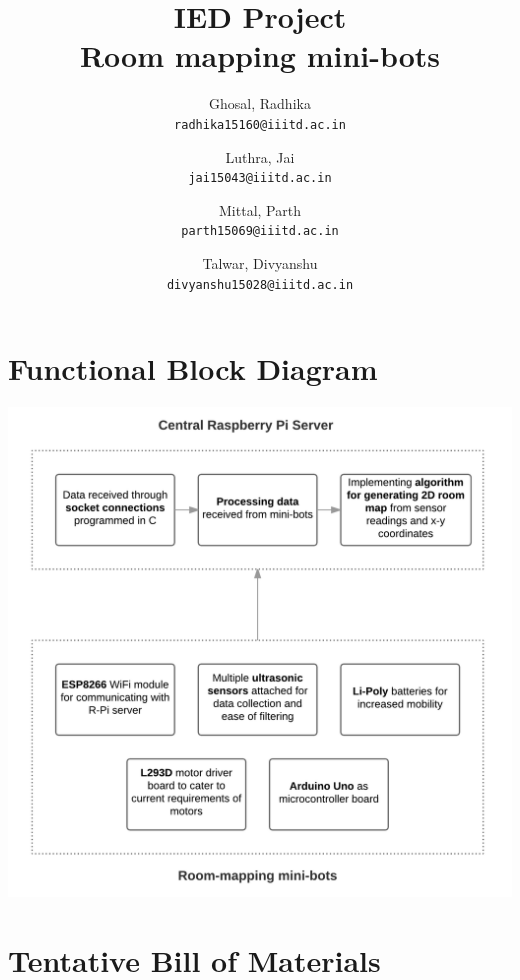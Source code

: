 \documentclass[12pt]{article}
\title{IED Project\\
        Room mapping mini-bots}
\author{
    Ghosal, Radhika\\
    \texttt{radhika15160@iiitd.ac.in}
    \and
    Luthra, Jai\\
    \texttt{jai15043@iiitd.ac.in}
    \and
    Mittal, Parth\\
    \texttt{parth15069@iiitd.ac.in}
    \and
    Talwar, Divyanshu\\
    \texttt{divyanshu15028@iiitd.ac.in}
}
\begin{document}
\maketitle
\tableofcontents

\pagebreak

\section{Functional Block Diagram}
\includegraphics[width=\textwidth]{blockdiag.png}

\pagebreak

\section{Tentative Bill of Materials}
\end{document}
